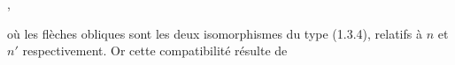 ,

où les flèches obliques sont les deux isomorphismes du type (1.3.4), relatifs à $n$ et $n'$ respectivement. Or cette compatibilité résulte de

